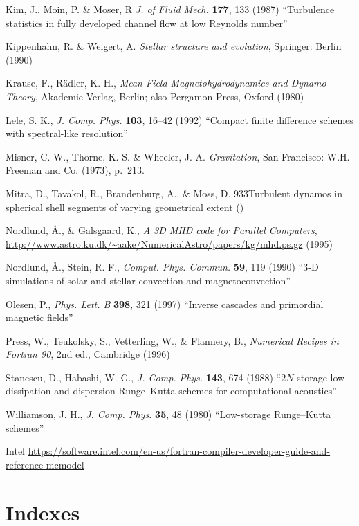 \documentclass[\mydriver,12pt,twoside,notitlepage,a4paper]{article}
\begin{document}
\begin{thebibliography}{99}
 Kim, J., Moin, P. \& Moser, R
\emph{J. of Fluid Mech.} \textbf{177}, 133 (1987)
``Turbulence statistics in fully developed channel flow at low Reynolds number''

 Kippenhahn, R. \& Weigert, A.
  \emph{Stellar structure and evolution}, Springer: Berlin (1990)

 Krause, F., R\"adler, K.-H.,
  \emph{Mean-Field Magneto\-hy\-dro\-dy\-na\-mics and Dynamo Theory\/},
  Akademie-Verlag, Berlin; also Pergamon Press, Oxford (1980)

Lele, S. K.,
  \emph{J. Comp. Phys.} \textbf{103}, 16--42 (1992)
  ``Compact finite difference schemes with spectral-like resolution''

 Misner, C. W., Thorne, K. S. \& Wheeler, J. A.
  \emph{Gravitation},
  San Francisco: W.H. Freeman and Co. (1973), p.~213.

 Mitra, D., Tavakol, R., Brandenburg, A., \& Moss, D.
{933}{Turbulent dynamos in spherical shell segments of varying geometrical extent} ()

 Nordlund, \AA., \& Galsgaard, K.,
{\it A 3D MHD code for Parallel Computers},
{\url{http://www.astro.ku.dk/~aake/NumericalAstro/papers/kg/mhd.ps.gz}}
(1995)

 Nordlund, \AA., Stein, R. F.,
  \emph{Comput. Phys. Commun.} \textbf{59}, 119 (1990)
  ``3-D simulations of solar and stellar convection and magnetoconvection''

 Olesen, P., \emph{Phys. Lett. B} \textbf{398}, 321 (1997)
  ``Inverse cascades and primordial magnetic fields''

 Press, W., Teukolsky, S., Vetterling, W., \& Flannery, B.,
  \emph{Numerical Recipes in Fortran 90}, 2nd ed., Cambridge (1996)

 Stanescu, D., Habashi, W. G.,
  \emph{J. Comp. Phys.} \textbf{143}, 674 (1988)
  ``$2N$-storage low dissipation and dispersion Runge--Kutta
  schemes for computational acoustics''

 Williamson, J. H.,
  \emph{J. Comp. Phys.} \textbf{35}, 48 (1980)
  ``Low-storage Runge--Kutta schemes''

 Intel \url{https://software.intel.com/en-us/fortran-compiler-developer-guide-and-reference-mcmodel}

\end{thebibliography}


\cleardoublepage

\part{Indexes}
\printindex[file]
\printindex[var]

\ \vfill\bigskip{}
\end{document}

